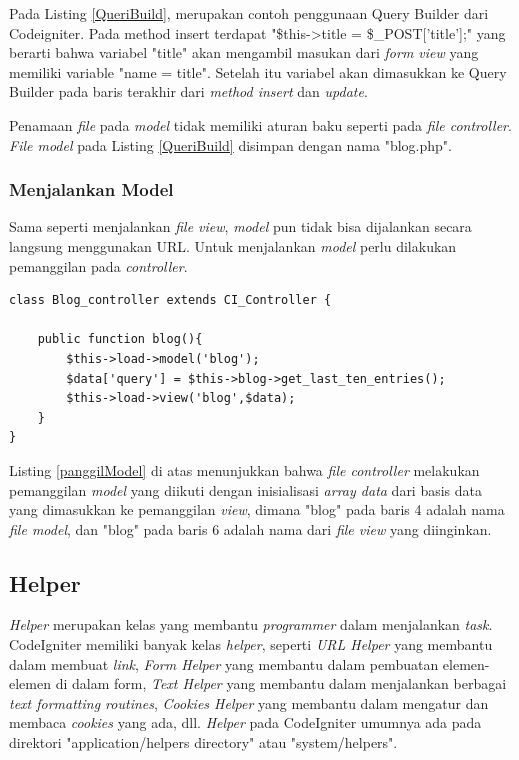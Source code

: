 	Pada Listing \ref{QueriBuild}, merupakan contoh penggunaan Query Builder dari Codeigniter. Pada method insert terdapat "\$this->title = \$\_POST['title'];" yang berarti bahwa variabel "title" akan mengambil masukan dari \textit{form view} yang memiliki variable "name = title". Setelah itu variabel akan dimasukkan ke Query Builder pada baris terakhir dari \textit{method insert} dan \textit{update}.
	
	Penamaan \textit{file} pada \textit{model} tidak memiliki aturan baku seperti pada \textit{file controller}. \textit{File model} pada Listing \ref{QueriBuild} disimpan dengan nama "blog.php".
	
	\subsubsection{Menjalankan Model}
	\label{subsub: menjalankanModel}
		
	Sama seperti menjalankan \textit{file view}, \textit{model} pun tidak bisa dijalankan secara langsung menggunakan URL. Untuk menjalankan \textit{model} perlu dilakukan pemanggilan pada \textit{controller}.
	
	\begin{lstlisting}[caption={Pemanggilan File Model}, label={panggilModel}]
class Blog_controller extends CI_Controller {

	public function blog(){
		$this->load->model('blog');
		$data['query'] = $this->blog->get_last_ten_entries();
		$this->load->view('blog',$data);
	}
}
	\end{lstlisting}
	
	Listing \ref{panggilModel} di atas menunjukkan bahwa \textit{file controller} melakukan pemanggilan \textit{model} yang diikuti dengan inisialisasi \textit{array data} dari basis data yang dimasukkan ke pemanggilan \textit{view}, dimana "blog" pada baris 4 adalah nama \textit{file model}, dan "blog" pada baris 6 adalah nama dari \textit{file view} yang diinginkan.
	
	\subsection{Helper}
	\label{sub: helper}
	
	\textit{Helper} merupakan kelas yang membantu \textit{programmer} dalam menjalankan \textit{task}. CodeIgniter memiliki banyak kelas \textit{helper}, seperti \textit{URL Helper} yang membantu dalam membuat \textit{link}, \textit{Form Helper} yang membantu dalam pembuatan elemen-elemen di dalam form, \textit{Text Helper} yang membantu dalam menjalankan berbagai \textit{text formatting routines}, \textit{Cookies Helper} yang membantu dalam mengatur dan membaca \textit{cookies} yang ada, dll. \textit{Helper} pada CodeIgniter umumnya ada pada direktori "application/helpers directory" atau "system/helpers". 
	
